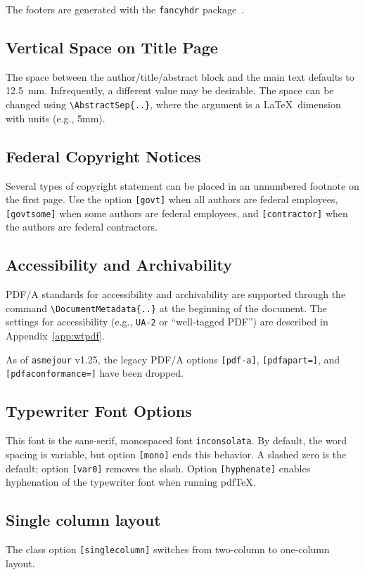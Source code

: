 \documentclass[balance,nocopyright,upint,varvw,hyphenate,barcolor=Goldenrod3,german]{asmejour}%
\newcommand*\pdfTeX{pdf\TeX}
\begin{document}
The footers are generated with the \texttt{fancyhdr} package~\cite{oostrum}.

\subsection{Vertical Space on Title Page} The space between the author/title/abstract block and the main text defaults to 12.5~mm. Infrequently, a different value may be desirable.  The space can be changed using \verb|\AbstractSep{..}|, where the argument is a \LaTeX\ dimension with units (e.g., 5mm).

\subsection{Federal Copyright Notices} Several types of copyright statement can be placed in an unnumbered footnote on the first page. Use the option \texttt{[govt]} when all authors are federal employees, \texttt{[govtsome]} when some authors are federal employees, and \texttt{[contractor]} when the authors are federal contractors.


\subsection{Accessibility and Archivability} PDF/A standards for accessibility and archivability are supported through the command \verb|\DocumentMetadata{..}| at the beginning of the document.  The settings for accessibility (e.g., \texttt{UA-2} or ``well-tagged PDF'') are described in Appendix~\ref{app:wtpdf}.

As of \texttt{asmejour} v1.25, the legacy PDF/A options \texttt{[pdf-a]}, \texttt{[pdfapart=]}, and \texttt{[pdfaconformance=]} have been dropped.


\subsection{Typewriter Font Options} This font is the sans-serif, monospaced font \texttt{inconsolata}. By default, the word spacing is variable, but option \texttt{[mono]} ends this behavior. A slashed zero is the default; option \texttt{[var0]} removes the slash. Option \texttt{[hyphenate]} enables hyphenation of the typewriter font when running \pdfTeX.

\subsection{Single column layout}  The class option \texttt{[singlecolumn]} switches from two-column to one-column layout.
\end{document}
